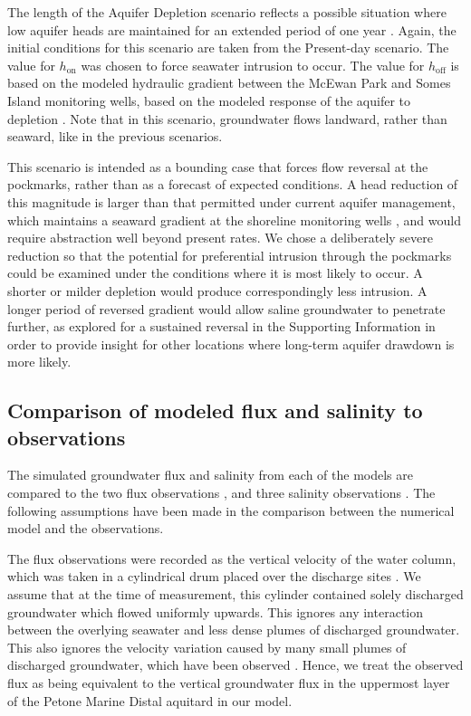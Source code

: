 \documentclass[pdflatex,sn-apa]{sn-jnl}%
\begin{document}
The length of the Aquifer Depletion scenario reflects a possible situation where low aquifer heads are maintained for an extended period of one year \citep{gyopari_lower_2014}.
Again, the initial conditions for this scenario are taken from the Present-day scenario.
The value for $h_{\mathrm{on}}$ was chosen to force seawater intrusion to occur.
The value for $h_{\mathrm{off}}$ is based on the modeled hydraulic gradient between the McEwan Park and Somes Island monitoring wells, based on the modeled response of the aquifer to depletion \citep{gyopari_lower_2014}.
Note that in this scenario, groundwater flows landward, rather than seaward, like in the previous scenarios.

This scenario is intended as a bounding case that forces flow reversal at the pockmarks, rather than as a forecast of expected conditions.
A head reduction of this magnitude is larger than that permitted under current aquifer management, which maintains a seaward gradient at the shoreline monitoring wells \citep{gyopari_lower_2014},
and would require abstraction well beyond present rates.
We chose a deliberately severe reduction so that the potential for preferential intrusion through the pockmarks could be examined under the conditions where it is most likely to occur.
A shorter or milder depletion would produce correspondingly less intrusion.
A longer period of reversed gradient would allow saline groundwater to penetrate further, as explored for a sustained reversal in the Supporting Information in order to provide insight for other locations where long-term aquifer drawdown is more likely.

\subsection{Comparison of modeled flux and salinity to observations}
The simulated groundwater flux and salinity from each of the models are compared to the two flux observations \citep{harding_characteristics_2000},
and three salinity observations \citep{hoffmann_fresh_2023}. The following assumptions have been made in the comparison between the numerical model and the observations.

The flux observations were recorded as the vertical velocity of the water column,
which was taken in a cylindrical drum placed over the discharge sites \citep{harding_characteristics_2000}.
We assume that at the time of measurement, this cylinder contained solely discharged groundwater which flowed uniformly upwards.
This ignores any interaction between the overlying seawater and less dense plumes of discharged groundwater.
This also ignores the velocity variation caused by many small plumes of discharged groundwater, which have been observed \citep{harding_characteristics_2000}.
Hence, we treat the observed flux as being equivalent to the vertical groundwater flux in the uppermost layer of the Petone Marine Distal aquitard in our model.
\end{document}
